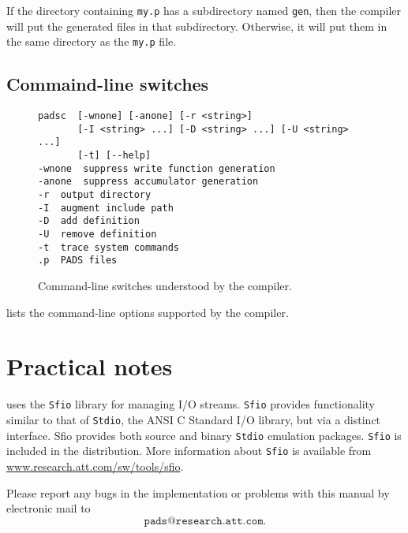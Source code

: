 If the directory containing \texttt{my.p} has a subdirectory named
\texttt{gen}, then the compiler will put the generated files in that
subdirectory.  Otherwise, it will put them in the same directory as
the \texttt{my.p} file.

\subsection{Commaind-line switches}
\begin{figure}
\begin{center}
\begin{verbatim}
padsc  [-wnone] [-anone] [-r <string>] 
       [-I <string> ...] [-D <string> ...] [-U <string> ...] 
       [-t] [--help]
-wnone	suppress write function generation
-anone	suppress accumulator generation
-r	output directory
-I	augment include path
-D	add definition
-U	remove definition
-t	trace system commands
.p	PADS files
\end{verbatim}
\caption{Command-line switches understood by the \pads{} compiler.}
\label{figure:intro-switches}
\end{center}
\end{figure}
 lists the command-line options
supported by the \pads{} compiler.



\section{Practical notes}
\pads{} uses the \texttt{Sfio} library for managing I/O
streams. \texttt{Sfio} provides functionality similar to that of
\texttt{Stdio}, the ANSI C Standard I/O library, but via a distinct
interface.  Sfio provides both source and binary \texttt{Stdio}
emulation packages. \texttt{Sfio} is included in the \pads{}
distribution.  More information about \texttt{Sfio} is available from
\url{www.research.att.com/sw/tools/sfio}.


Please report any bugs in the \PADS{} implementation or problems with
this manual by electronic mail to 
\[
\texttt{pads@research.att.com}.
\]